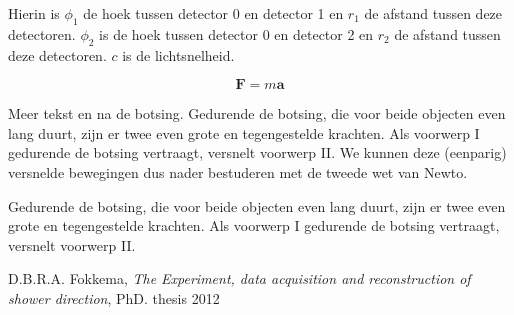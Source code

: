 
Hierin is $\phi_{1}$ de hoek tussen detector 0 en detector 1 en $r_{1}$ de afstand tussen deze detectoren. $\phi_{2}$ is de hoek tussen detector 0 en detector 2 en $r_{2}$ de afstand tussen deze detectoren. $c$ is de lichtsnelheid.






\begin{equation}
    \mathbf{F}=m\mathbf{a}
\end{equation}

Meer tekst en na de botsing. Gedurende de botsing, die voor beide
objecten even lang duurt, zijn er twee even grote en tegengestelde
krachten. Als voorwerp I gedurende de botsing vertraagt, versnelt
voorwerp II. We kunnen deze (eenparig) versnelde bewegingen dus nader
bestuderen met de tweede wet van Newto.


Gedurende de botsing, die voor beide objecten even lang duurt, zijn er
twee even grote en \cite{klaasboekje} tegengestelde krachten. Als voorwerp I gedurende de
botsing vertraagt, versnelt voorwerp II.

\begin{thebibliography}{9}
        D.B.R.A. Fokkema, \emph{The \hisparc Experiment, data acquisition and reconstruction of shower direction}, PhD. thesis 2012
\end{thebibliography}



